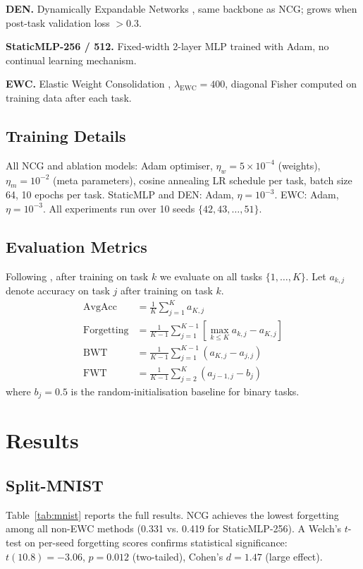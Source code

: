\documentclass[conference]{IEEEtran}
\begin{document}
\textbf{DEN.} Dynamically Expandable Networks \cite{yoon2018}, same backbone as NCG; grows when post-task validation loss $> 0.3$.

\textbf{StaticMLP-256 / 512.} Fixed-width 2-layer MLP trained with Adam, no continual learning mechanism.

\textbf{EWC.} Elastic Weight Consolidation \cite{kirkpatrick2017}, $\lambda_{\mathrm{EWC}} = 400$, diagonal Fisher computed on training data after each task.

\subsection{Training Details}
All NCG and ablation models: Adam optimiser, $\eta_w = 5 \times 10^{-4}$ (weights), $\eta_m = 10^{-2}$ (meta parameters), cosine annealing LR schedule per task, batch size 64, 10 epochs per task. StaticMLP and DEN: Adam, $\eta = 10^{-3}$. EWC: Adam, $\eta = 10^{-3}$. All experiments run over 10 seeds $\{42, 43, \ldots, 51\}$.

\subsection{Evaluation Metrics}
Following \cite{lopez2017}, after training on task $k$ we evaluate on all tasks $\{1, \ldots, K\}$. Let $a_{k,j}$ denote accuracy on task $j$ after training on task $k$.
\begin{align}
    \mathrm{AvgAcc} &= \frac{1}{K} \sum_{j=1}^{K} a_{K,j} \\
    \mathrm{Forgetting} &= \frac{1}{K-1} \sum_{j=1}^{K-1} \left[ \max_{k \leq K} a_{k,j} - a_{K,j} \right] \\
    \mathrm{BWT} &= \frac{1}{K-1} \sum_{j=1}^{K-1} (a_{K,j} - a_{j,j}) \\
    \mathrm{FWT} &= \frac{1}{K-1} \sum_{j=2}^{K} (a_{j-1,j} - b_j)
\end{align}
where $b_j = 0.5$ is the random-initialisation baseline for binary tasks.

\section{Results}
\subsection{Split-MNIST}
Table~\ref{tab:mnist} reports the full results. NCG achieves the lowest forgetting among all non-EWC methods (0.331 vs. 0.419 for StaticMLP-256). A Welch's $t$-test on per-seed forgetting scores confirms statistical significance: $t(10.8) = -3.06$, $p = 0.012$ (two-tailed), Cohen's $d = 1.47$ (large effect).
\end{document}
